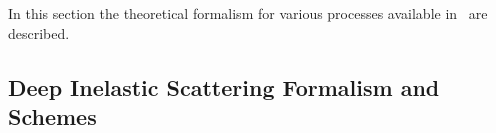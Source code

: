
\def\kt{\ensuremath{k_t}}
\newcommand{\Pmax}{p}
\newcommand{\CCFM}{CCFMa,CCFMb,Catani:1989sg,CCFMd}


%
In this section the theoretical formalism for various processes available in \fitter\ are described.



\subsection{Deep Inelastic Scattering Formalism and Schemes}
\label{dissection}


